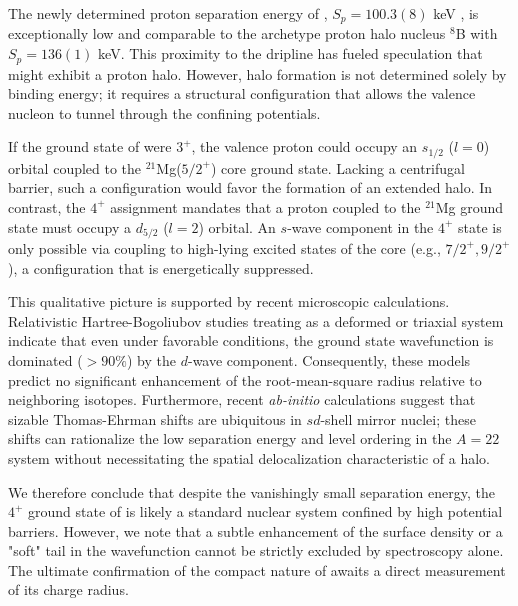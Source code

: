 \documentclass[

reprint,

superscriptaddress,









amsmath,amssymb,
aps,






floatfix,
prl
]{revtex4-2}
\begin{document}
The newly determined proton separation energy of \alum{}, $S_p = 100.3(8)$ keV \cite{Cam24,Sun24}, is exceptionally low and comparable to the archetype proton halo nucleus $^{8}$B \cite{Sme99,Kor18} with $S_p = 136(1)$ keV.
This proximity to the dripline has fueled speculation that \alum{} might exhibit a proton halo.
However, halo formation is not determined solely by binding energy; it requires a structural configuration that allows the valence nucleon to tunnel through the confining potentials.

If the ground state of \alum{} were $3^+$, the valence proton could occupy an $s_{1/2}$ ($l=0$) orbital coupled to the $^{21}$Mg($5/2^+$) core ground state.
Lacking a centrifugal barrier, such a configuration would favor the formation of an extended halo.
In contrast, the $4^+$ assignment mandates that a proton coupled to the $^{21}$Mg ground state must occupy a $d_{5/2}$ ($l=2$) orbital.
An $s$-wave component in the $4^+$ state is only possible via coupling to high-lying excited states of the core (e.g., $7/2^+, 9/2^+$), a configuration that is energetically suppressed.



















This qualitative picture is supported by recent microscopic calculations.
Relativistic Hartree-Bogoliubov studies treating \alum{} as a deformed or triaxial system \cite{Zha24,Pap25} indicate that even under favorable conditions, the ground state wavefunction is dominated ($>90\%$) by the $d$-wave component.
Consequently, these models predict no significant enhancement of the root-mean-square radius relative to neighboring isotopes.
Furthermore, recent \emph{ab-initio} calculations \cite{Li23} suggest that sizable Thomas-Ehrman shifts are ubiquitous in $sd$-shell mirror nuclei; these shifts can rationalize the low separation energy and level ordering in the $A=22$ system without necessitating the spatial delocalization characteristic of a halo.

We therefore conclude that despite the vanishingly small separation energy, the $4^+$ ground state of \alum{} is likely a standard nuclear system confined by high potential barriers.
However, we note that a subtle enhancement of the surface density or a "soft" tail in the wavefunction cannot be strictly excluded by spectroscopy alone.
The ultimate confirmation of the compact nature of \alum{} awaits a direct measurement of its charge radius.
\end{document}
